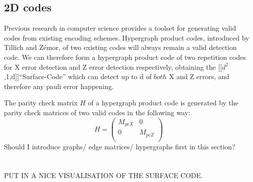 \subsection{2D codes}
Previous research in computer science 
provides a toolset for generating valid codes
from existing encoding schemes. 
Hypergraph product codes, introduced by Tillich and Z\'emor,
of two 
existing codes will always remain a valid detection code.
We can therefore form a hypergraph product code of two repetition
codes for X error detection and Z error detection respectively,
obtaining the [[$d^2$,1,d]]``Surface-Code'' which can detect up
to d of $both$ X and Z errors, and 
therefore any pauli error happening.

The parity check matrix $H$ of a hypergraph product code is generated
by the parity check matrices of two valid codes in the following
way:
\begin{equation}
	H = \left(\begin{array}{cc}
		M_{pcX} & 0 \\
		0 & M_{pcZ} \\
	\end{array}\right)
\end{equation}
Should I introduce graphs/ edge matrices/ hypergraphs first in this section? \\
\\
\\
PUT IN A NICE VISUALISATION OF THE SURFACE CODE.